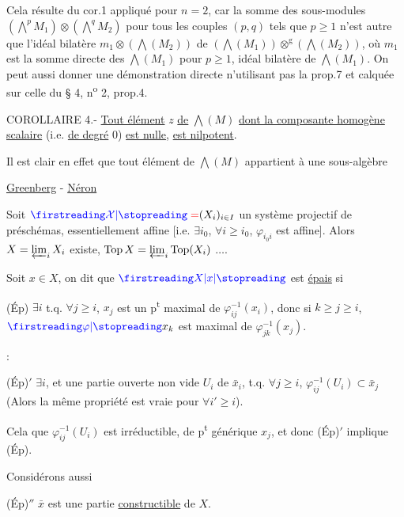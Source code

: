 Cela résulte du cor.1 appliqué pour $n=2$, car la somme des sous-modules $(\mathop{\bigwedge}\limits^p M_1)\otimes(\mathop{\bigwedge}\limits^q M_2)$ pour tous les couples $(p,q)$ tels que $p\geq1$ n'est autre que l'idéal bilatère $m_1\otimes(\bigwedge(M_2))$ de $(\bigwedge(M_1))\otimes^{\mathrm g}(\bigwedge(M_2))$, où $m_1$ est la somme directe des $\bigwedge(M_1)$ pour $p\geq1$, idéal bilatère de $\bigwedge(M_1)$. On peut aussi donner une démonstration directe n'utilisant pas la prop.7 et calquée sur celle du § 4, n\textsuperscript{o} 2, prop.4.

COROLLAIRE 4.- \uline{Tout élément} $z$ \uline{de} $\bigwedge(M)$ \uline{dont la composante homogène scalaire} (i.e. \uline{de degré} 0) \uline{est nulle}, \uline{est nilpotent}.

Il est clair en effet que tout élément de $\bigwedge(M)$ appartient à une sous-algèbre

\begin{flushright}\uline{Greenberg} - \uline{Néron}\end{flushright}

Soit $\deleted{\unsure{\mathcal X}=}(X_i)_{i\in I}$ un système projectif de préschémas, essentiellement affine [i.e. $\exists i_0$, $\forall i\geq i_0$, $\varphi_{i_0i}$ est affine]. Alors $X=\varprojlim_i X_i$ existe, $\mathrm{Top}\,X=\varprojlim_i\mathrm{Top}(X_i)$ $\ldots$.

Soit $x\in X$, on dit que $\unsure{X|x}$ est \uline{épais} si

(Ép) $\exists i$ t.q. $\forall j\geq i$, $x_j$ est un p\textsuperscript{t} maximal de $\varphi_{ij}^{-1}(x_i)$, donc si $k\geq j\geq i$, $\deleted{\unsure{\varphi}}x_k$ est maximal de $\varphi_{jk}^{-1}(x_j)$.

:

(Ép)$'$ $\exists i$,  et une partie ouverte non vide $U_i$ de $\bar x_i$, t.q. $\forall j\geq i$, $\varphi_{ij}^{-1}(U_i)\subset\bar x_j$ (Alors la même propriété est vraie pour $\forall i'\geq i$).

Cela  que $\varphi_{ij}^{-1}(U_i)$ est irréductible, de p\textsuperscript{t} générique $x_j$, et donc (Ép)$'$ implique (Ép).

Considérons aussi

(Ép)$''$ $\bar x$  est une partie \uline{constructible} de $X$.

